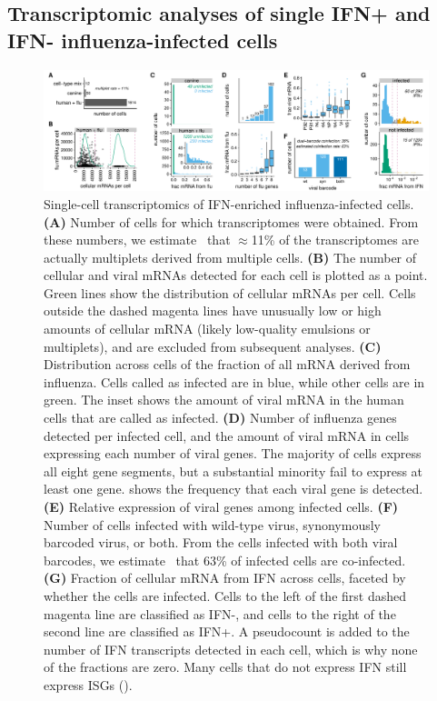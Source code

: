 \documentclass[9pt,lineno]{elife}
\begin{document}
\subsection{Transcriptomic analyses of single IFN+ and IFN- influenza-infected cells}

\begin{figure}
\begin{fullwidth}

\includegraphics[width=\linewidth, clip=false]{figures/single_cell_figures/p_cell_summary.pdf}

\caption{
Single-cell transcriptomics of IFN-enriched influenza-infected cells.
{\bf (A)} 
Number of cells for which transcriptomes were obtained.
From these numbers, we estimate~\citep{bloom2018estimating} that $\approx$11\% of the transcriptomes are actually multiplets derived from multiple cells. 
{\bf (B)} The number of cellular and viral mRNAs detected for each cell is plotted as a point.
Green lines show the distribution of cellular mRNAs per cell.
Cells outside the dashed magenta lines have unusually low or high amounts of cellular mRNA (likely low-quality emulsions or multiplets), and are excluded from subsequent analyses.
{\bf (C)} Distribution across cells of the fraction of all mRNA derived from influenza.
Cells called as infected are in blue, while other cells are in green.
The inset shows the amount of viral mRNA in the human cells that are called as infected.
{\bf (D)} Number of influenza genes detected per infected cell, and the amount of viral mRNA in cells expressing each number of viral genes.
The majority of cells express all eight gene segments, but a substantial minority fail to express at least one gene.
 shows the frequency that each viral gene is detected.
{\bf (E)} Relative expression of viral genes among infected cells.
{\bf (F)} Number of cells infected with wild-type virus, synonymously barcoded virus, or both.
From the cells infected with both viral barcodes, we estimate~\citep{bloom2018estimating} that 63\% of infected cells are co-infected.
{\bf (G)} Fraction of cellular mRNA from IFN across cells, faceted by whether the cells are infected.
Cells to the left of the first dashed magenta line are classified as IFN-, and cells to the right of the second line are classified as IFN+.
A pseudocount is added to the number of IFN transcripts detected in each cell, which is why none of the fractions are zero.
Many cells that do not express IFN still express ISGs ().
}
\label{fig:transcriptomics}


\end{fullwidth}
\end{figure}
\end{document}
